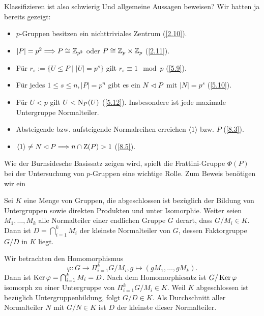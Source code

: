 Klassifizieren ist also schwierig Und allgemeine Aussagen beweisen? Wir hatten ja bereits gezeigt:
\begin{itemize}
 \item $p$-Gruppen besitzen ein nichttriviales Zentrum (\ref{2.10}).
 \item $|P|=p^2 \Longrightarrow P\cong \mathbb{Z}_{p^2}$ oder $P\cong \mathbb{Z}_p \times \mathbb{Z}_p$ (\ref{2.11}).
 \item F\"ur $r_s:=\lbrace U\leq P\mid|U|=p^s\rbrace$ gilt $r_s\equiv 1 \mod p$ (\ref{5.9}).
 \item F\"ur jedes $1\leq s\leq n, |P|=p^n$ gibt es ein $N\lhd P$ mit $|N|=p^s$ (\ref{5.10}).
 \item F\"ur $U<p$ gilt $U<\operatorname{N}_P(U)$ (\ref{5.12}). Insbesondere ist jede maximale Untergruppe Normalteiler.
 \item Absteigende bzw. aufsteigende Normalreihen erreichen $\langle 1\rangle$ bzw. $P$ (\ref{8.3}).
 \item $\langle 1\rangle\neq N\lhd P \Longrightarrow n\cap \operatorname{Z}(P)>1$ (\ref{8.5}).
\end{itemize}
Wie der Burnsidesche Basissatz zeigen wird, spielt die Frattini-Gruppe $\Phi(P)$ bei der Untersuchung von $p$-Gruppen eine wichtige Rolle. Zum Beweis ben\"otigen wir ein 
\begin{lemma}\label{10.1}
 Sei $K$ eine Menge von Gruppen, die abgeschlossen ist bez\"uglich der Bildung von Untergruppen sowie direkten Produkten und unter Isomorphie. Weiter seien $M_1,\ldots,M_k$ alle Normalteiler einer endlichen Gruppe $G$ derart, dass $G/M_i \in K$. Dann ist $D=\bigcap_{i=1}^kM_i$ der kleinste Normalteiler von $G$, dessen Faktorgruppe $G/D$ in $K$ liegt.
\end{lemma}

\begin{beweis}
 Wir betrachten den Homomorphismus $$\varphi:G\to \Pi_{i=1}^kG/M_i, g\mapsto (gM_1, \ldots, gM_k).$$ Dann ist $\operatorname{Ker}\varphi=\bigcap_{i=1}^kM_i=D$. Nach dem Homomorphiesatz ist $G/\operatorname{Ker}\varphi$ isomorph zu einer Untergruppe von $\Pi_{i=1}^kG/M_i\in K$. Weil $K$ abgeschlossen ist bez\"uglich Untergruppenbildung, folgt $G/D\in K$. Als Durchschnitt aller Normalteiler $N$ mit $G/N\in K$ ist $D$ der kleinste dieser Normalteiler.
\end{beweis}

